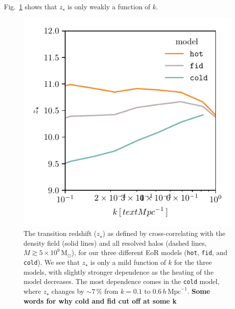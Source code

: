 \documentclass[a4paper,fleqn,usenatbib]{mnras}
\newcommand{\Msun}{\ensuremath{\text{M}_\odot}}
\newcommand{\hoverMpc}{\ensuremath{h\,\text{Mpc}^{-1}}}
\newcommand{\fid}{\texttt{fid}}
\newcommand{\hot}{\texttt{hot}}
\newcommand{\cold}{\texttt{cold}}
\newcommand{\zst}{\ensuremath{z_{\star}}}
\begin{document}
Fig.~\ref{fig:ztran_vs_k} shows that \zst{} is only weakly a function of $k$. 

\begin{figure}
\includegraphics[width=\columnwidth]{plots/ztran_vs_k.pdf}
\caption{The transition redshift ($\zst$) as defined by cross-correlating with the
density field (solid lines) and all resolved halos (dashed lines, $M\gtrsim
5\times10^9\,\Msun$), for our three different EoR models (\hot{}, \fid{}, and
\cold{}). We see that \zst{} is only a mild function of $k$ for the three
models, with slightly stronger dependence as the heating of the model
decreases. The most dependence comes in the \cold{} model, where \zst{}
changes by $\sim7\,\%$ from $k=0.1$ to $0.6\,\hoverMpc$. {\bf Some words for
why cold and fid cut off at some k}}
\label{fig:ztran_vs_k}
\end{figure}
\end{document}
